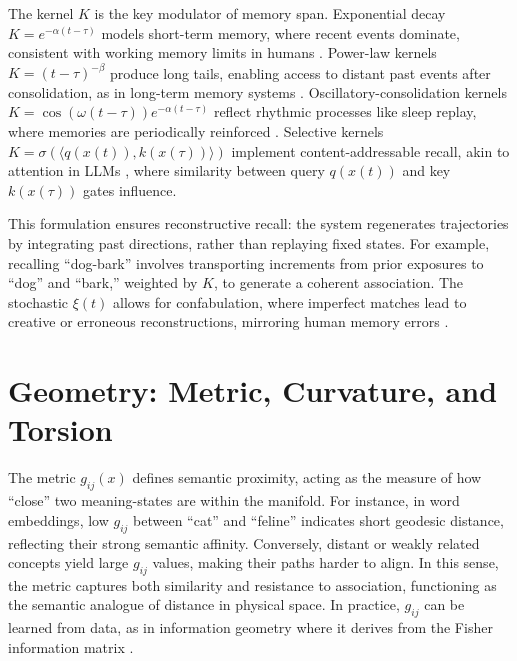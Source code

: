 \documentclass[a4paper,12pt]{article}
\begin{document}
The kernel $K$ is the key modulator of memory span. Exponential decay $K = e^{-\alpha (t-\tau)}$ models short-term memory, where recent events dominate, consistent with working memory limits in humans \citep{miller1956magical}. Power-law kernels $K = (t-\tau)^{-\beta}$ produce long tails, enabling access to distant past events after consolidation, as in long-term memory systems \citep{mcclelland1995why}. Oscillatory-consolidation kernels $K = \cos(\omega (t-\tau)) e^{-\alpha (t-\tau)}$ reflect rhythmic processes like sleep replay, where memories are periodically reinforced \citep{stickgold2005sleep}. Selective kernels $K = \sigma(\langle q(x(t)), k(x(\tau)) \rangle)$ implement content-addressable recall, akin to attention in LLMs \citep{bahdanau2014neural}, where similarity between query $q(x(t))$ and key $k(x(\tau))$ gates influence.

This formulation ensures reconstructive recall: the system regenerates trajectories by integrating past directions, rather than replaying fixed states. For example, recalling ``dog-bark'' involves transporting increments from prior exposures to ``dog'' and ``bark,'' weighted by $K$, to generate a coherent association. The stochastic $\xi(t)$ allows for confabulation, where imperfect matches lead to creative or erroneous reconstructions, mirroring human memory errors \citep{loftus1974reconstruction}.

\section{Geometry: Metric, Curvature, and Torsion}
The metric $g_{ij}(x)$ defines semantic proximity, acting as the measure of how ``close'' two meaning-states are within the manifold. For instance, in word embeddings, low $g_{ij}$ between ``cat'' and ``feline'' indicates short geodesic distance, reflecting their strong semantic affinity. Conversely, distant or weakly related concepts yield large $g_{ij}$ values, making their paths harder to align. In this sense, the metric captures both similarity and resistance to association, functioning as the semantic analogue of distance in physical space. In practice, $g_{ij}$ can be learned from data, as in information geometry where it derives from the Fisher information matrix \citep{amari1985differential}.
\end{document}
